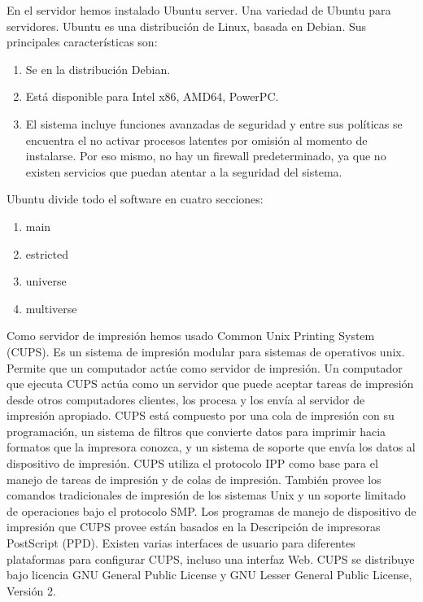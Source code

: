 En el servidor hemos instalado Ubuntu server. Una variedad de Ubuntu para servidores. Ubuntu es una distribución de Linux, basada en Debian. Sus principales características son:
\begin{enumerate}
	\item Se en la distribución Debian.
	\item Está disponible para Intel x86, AMD64, PowerPC.
	\item El sistema incluye funciones avanzadas de seguridad y entre sus políticas se encuentra el no activar procesos latentes por omisión al momento de instalarse. Por eso mismo, no hay un firewall predeterminado, ya que no existen servicios que puedan atentar a la seguridad del sistema. 
\end{enumerate}

Ubuntu divide todo el software en cuatro secciones:
\begin{enumerate}
	\item main 
	\item estricted
	\item universe
	\item multiverse
\end{enumerate}

Como servidor de impresión hemos usado Common Unix Printing System (CUPS). Es un sistema de impresión modular para sistemas de operativos unix. Permite que un computador actúe como servidor de impresión. Un computador que ejecuta CUPS actúa como un servidor que puede aceptar tareas de impresión desde otros computadores clientes, los procesa y los envía al servidor de impresión apropiado. \newline
CUPS está compuesto por una cola de impresión con su programación, un sistema de filtros que convierte datos para imprimir hacia formatos que la impresora conozca, y un sistema de soporte que envía los datos al dispositivo de impresión. CUPS utiliza el protocolo IPP como base para el manejo de tareas de impresión y de colas de impresión. También provee los comandos tradicionales de impresión de los sistemas Unix y un soporte limitado de operaciones bajo el protocolo SMP. Los programas de manejo de dispositivo de impresión que CUPS provee están basados en la Descripción de impresoras PostScript (PPD). Existen varias interfaces de usuario para diferentes plataformas para configurar CUPS, incluso una interfaz Web. CUPS se distribuye bajo licencia GNU General Public License y GNU Lesser General Public License, Versión 2.


